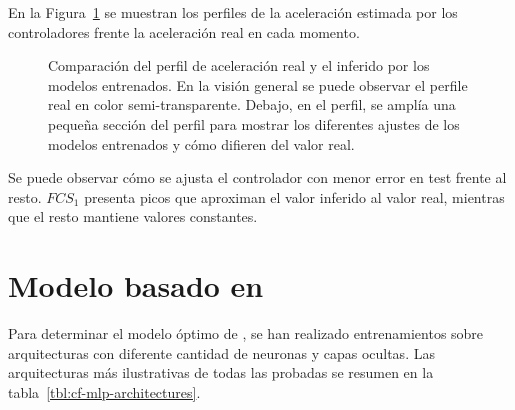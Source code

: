 En la Figura~\ref{fig:fcs-test-comparisons} se muestran los perfiles de la aceleración estimada por los controladores frente la aceleración real en cada momento. 

\begin{figure}
	\centering
	\qquad
	\caption[Comparación del perfil de aceleración real y el inferido por los modelos entrenados]{Comparación del perfil de aceleración real y el inferido por los modelos entrenados. En la visión general se puede observar el perfile real en color semi-transparente. Debajo, en el perfil, se amplía una pequeña sección del perfil para mostrar los diferentes ajustes de los modelos entrenados y cómo difieren del valor real.}
	\label{fig:fcs-test-comparisons}
\end{figure}

Se puede observar cómo se ajusta el controlador con menor error en test frente al resto. $FCS_1$ presenta picos que aproximan el valor inferido al valor real, mientras que el resto mantiene valores constantes.

\section{Modelo basado en }

Para determinar el modelo óptimo de , se han realizado entrenamientos sobre arquitecturas con diferente cantidad de neuronas y capas ocultas. Las arquitecturas más ilustrativas de todas las probadas se resumen en la tabla~\ref{tbl:cf-mlp-architectures}.

